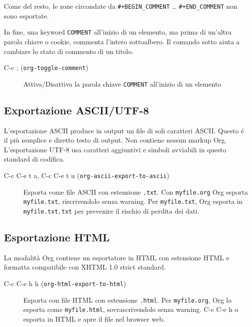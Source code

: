 \documentclass[11pt]{article}
\begin{document}
Come del resto, le zone circondate da \texttt{\#+BEGIN\_COMMENT}
\ldots{} \texttt{\#+END\_COMMENT} non sono esportate.

In fine, una keyword \texttt{COMMENT} all'inizio di un elemento, ma prima di
un'altra parola chiave o cookie, commenta l'intero sottoalbero. Il
comando sotto aiuta a cambiare lo stato di commento di un titolo.

\begin{description}
\item[{C-c ; (\texttt{org-toggle-comment})}] Attiva/Disattiva la parola chiave \texttt{COMMENT} all'inizio di un
elemento
\end{description}

\subsection{Exportazione ASCII/UTF-8}
\label{sec:orgc4a76ca}
L'esportazione ASCII produce in output un file di soli caratteri
ASCII. Questo é il più semplice e diretto testo di output. Non
contiene nessun markup Org. L'esportazione UTF-8 usa caratteri
aggiuntivi e simboli avviabili in questo standard di codifica.

\begin{description}
\item[{C-c C-e t a, C-c C-e t u (\texttt{org-ascii-export-to-ascii})}] Esporta come file ASCII con estensione \texttt{.txt}. Con \texttt{myfile.org} Org
esporta \texttt{myfile.txt}, riscrivendolo senza warning. Per \texttt{myfile.txt},
Org esporta in \texttt{myfile.txt.txt} per prevenire il rischio di perdita
dei dati.
\end{description}

\subsection{Esportazione HTML}
\label{sec:org9ee3273}
La modalità Org contiene un esportatore in HTML con estensione HTML e
formatta compatibile con XHTML 1.0 strict standard.

\begin{description}
\item[{C-c C-e h h (\texttt{org-html-export-to-html})}] Esporta con file HTML con estensione \texttt{.html}. Per \texttt{myfile.org}, Org
lo esporta come \texttt{myfile.html}, sovrascrivendolo senza
warning. C-c C-e h o esporta in HTML e apre il file nel
browser web.
\end{description}
\end{document}
